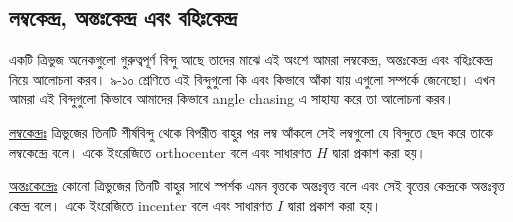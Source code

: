 \documentclass[a4paper,11pt]{article}
\begin{document}
\subsection{লম্বকেন্দ্র, অন্তঃকেন্দ্র এবং বহিঃকেন্দ্র}
একটি ত্রিভুজ অনেকগুলো গুরুত্বপূর্ণ বিন্দু আছে তাদের মাঝে এই অংশে আমরা লম্বকেন্দ্র, অন্তঃকেন্দ্র এবং বহিঃকেন্দ্র নিয়ে আলোচনা করব। ৯-১০ শ্রেণিতে এই বিন্দুগুলো কি এবং কিভাবে আঁকা যায় এগুলো সম্পর্কে জেনেছো। এখন আমরা এই বিন্দুগুলো কিভাবে আমাদের কিভাবে angle chasing এ সাহায্য করে তা আলোচনা করব। 

\underline{লম্বকেন্দ্রঃ} ত্রিভুজের তিনটি শীর্ষবিন্দু থেকে বিপরীত বাহুর পর লম্ব আঁকলে সেই লম্বগুলো যে বিন্দুতে ছেদ করে তাকে লম্বকেন্দ্রে বলে। একে ইংরেজিতে orthocenter বলে এবং সাধারণত $H$ দ্বারা প্রকাশ করা হয়। 

\underline{অন্তঃকেন্দ্রেঃ} কোনো ত্রিভুজের তিনটি বাহুর সাথে স্পর্শক এমন বৃত্তকে অন্তঃবৃত্ত বলে এবং সেই বৃত্তের কেন্দ্রকে অন্তঃবৃত্ত কেন্দ্র বলে। একে ইংরেজিতে incenter বলে এবং সাধারণত $I$ দ্বারা প্রকাশ করা হয়। 
\end{document}
